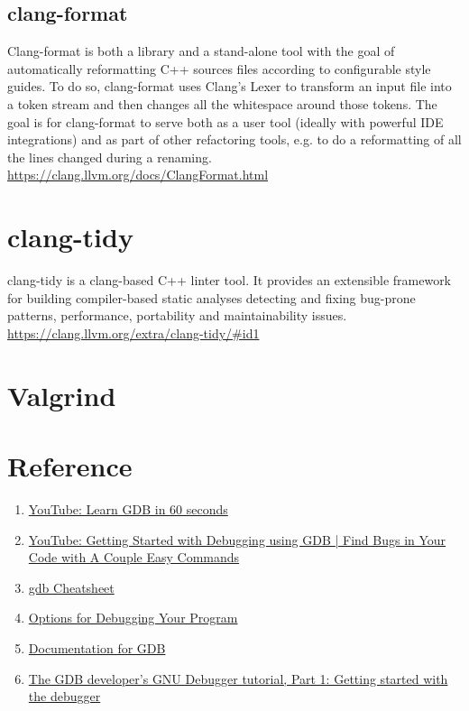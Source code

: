 \subsection{clang-format}%
\label{sub:clang_format}
Clang-format is both a library and a stand-alone tool with the goal of automatically reformatting C++ sources files according to configurable style guides. To do so, clang-format uses Clang’s Lexer to transform an input file into a token stream and then changes all the whitespace around those tokens. The goal is for clang-format to serve both as a user tool (ideally with powerful IDE integrations) and as part of other refactoring tools, e.g. to do a reformatting of all the lines changed during a renaming.
\href{ClangFormat}{https://clang.llvm.org/docs/ClangFormat.html} 


\section{clang-tidy}%
\label{sec:clang_tidy}
clang-tidy is a clang-based C++ linter tool. It provides an extensible framework for building compiler-based static analyses detecting and fixing bug-prone patterns, performance, portability and maintainability issues.
\href{clang-tidy}{https://clang.llvm.org/extra/clang-tidy/\#id1} 


\section{Valgrind}


\section{Reference}
\begin{enumerate}
  \item \href{https://www.youtube.com/watch?v=mfmXcbiRs0E&list=PL9IEJIKnBJjHGWPN_S9NS_Ky1-tC8ZrUI}{YouTube: Learn GDB in 60 seconds}

  \item \href{https://www.youtube.com/watch?v=Dq8l1_-QgAc}{YouTube: Getting Started with Debugging using GDB | Find Bugs in Your Code with A Couple Easy Commands}

  \item \href{https://www.google.com/url?q=https://cs.brown.edu/courses/cs033/docs/guides/gdb.pdf&sa=D&source=docs&ust=1661288718090053&usg=AOvVaw3EbYRk1zHStEJlu-FSbeiY}{gdb Cheatsheet}

  \item \href{https://gcc.gnu.org/onlinedocs/gcc/index.html\#toc-GCC-Command-Options}{Options for Debugging Your Program}

  \item \href{https://sourceware.org/gdb/download/onlinedocs/}{Documentation for GDB}

  \item \href{https://developers.redhat.com/blog/2021/04/30/the-gdb-developers-gnu-debugger-tutorial-part-1-getting-started-with-the-debugger\#}{The GDB developer's GNU Debugger tutorial, Part 1: Getting started with the debugger}
\end{enumerate}
